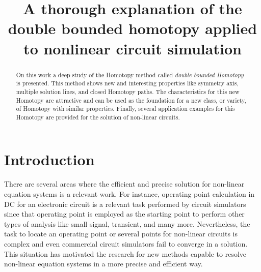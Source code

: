 \documentclass[conference,letterpaper,onecolumn]{IEEEtran}
\begin{document}
\title{A thorough explanation of the double bounded homotopy applied to nonlinear circuit simulation}

\author{
\and
{}
\and
{}
\and
{}
}


\maketitle

\begin{abstract}
On this work a deep study of the Homotopy method called {\it double bounded Homotopy} is presented. This method shows new and interesting properties like symmetry axis, multiple solution lines, and closed Homotopy paths. The characteristics for this new Homotopy are attractive and can be used as the foundation for a new class, or variety, of Homotopy with similar properties. Finally, several application examples for this Homotopy are provided for the solution of non-linear circuits.
\end{abstract}
 

\section{Introduction}

There are several areas where the efficient and precise solution for non-linear equation systems is a relevant work. For instance, operating point calculation in DC for an electronic circuit is a relevant task performed by circuit simulators since that operating point is employed as the starting point to perform other types of analysis like small signal, transient, and many more. Nevertheless, the task to locate an operating point or several points for non-linear circuits is complex and even commercial circuit simulators fail to converge in a solution. This situation has motivated the research for new methods capable to resolve non-linear equation systems in a more precise and efficient way.
\end{document}

